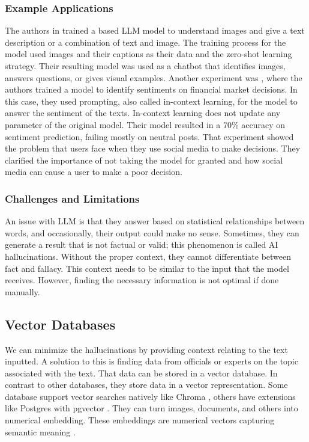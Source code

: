 

\subsubsection{Example Applications}
The authors in \cite{koh2023groundinglanguagemodelsimages} trained a based LLM model to understand images and give a text description or a combination of text and image. The training process for
the model used images and their captions as their data and the zero-shot learning strategy. Their resulting model was used as a chatbot that identifies images, answers questions, or gives
visual examples. Another experiment was \cite{inproceedings}, where the authors trained a model to identify sentiments on financial market decisions. In this case, they used prompting, also called in-context learning, for 
the model to answer the sentiment of the texts. In-context learning does not update any parameter of the original model. Their model resulted in a 70\% accuracy on sentiment prediction, failing mostly on neutral posts.
That experiment showed the problem that users face when they use social media to make decisions. They clarified the importance of not taking the model for granted and how social media can cause a user to make a poor decision.

\subsubsection{Challenges and Limitations}
An issue with LLM is that they answer based on statistical relationships between words, and occasionally, their output could make no sense. Sometimes, they can generate a result that is not factual
or valid; this phenomenon is called AI hallucinations. Without the proper context, they cannot differentiate between fact and fallacy. This context needs to be similar to the input that the model
receives. However, finding the necessary information is not optimal if done manually.

\subsection{Vector Databases}
We can minimize the hallucinations by providing context relating to the text inputted. A solution to this is finding data from officials or experts on the topic associated with the text. That data can be stored
in a vector database. In contrast to other databases, they store data in a vector representation.  Some database support vector searches natively like Chroma \cite{chroma}, others have extensions
like Postgres with pgvector \cite{pgvector}. They can turn images, documents, and others into numerical embedding. These embeddings are numerical vectors capturing semantic meaning \cite{10455990}.
 
